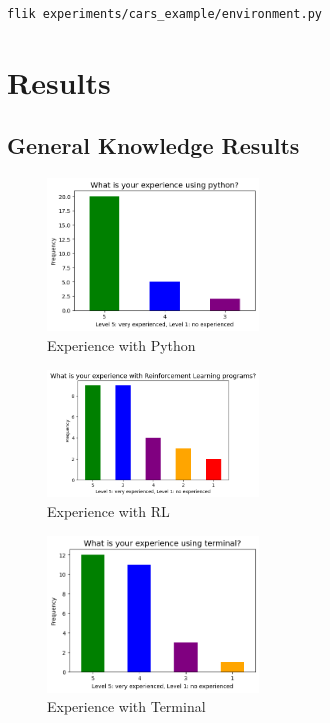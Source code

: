 \begin{lstlisting}[language=bash]
flik experiments/cars_example/environment.py
\end{lstlisting}

\section{Results}
\label{sec:appendix-results}

\subsection{General Knowledge Results}
\begin{figure}[H]
    \centering
    \includegraphics[width=0.5\textwidth]{figures/experience-python.png}
    \caption{Experience with Python}
    \label{fig:exp-py}
\end{figure}

\begin{figure}[H]
    \centering
    \includegraphics[width=0.5\textwidth]{figures/experience-rl.png}
    \caption{Experience with RL}
    \label{fig:exp-rl}
\end{figure}

\begin{figure}[H]
    \centering
    \includegraphics[width=0.5\textwidth]{figures/experience-terminal.png}
    \caption{Experience with Terminal}
    \label{fig:exp-terminal}
\end{figure}

